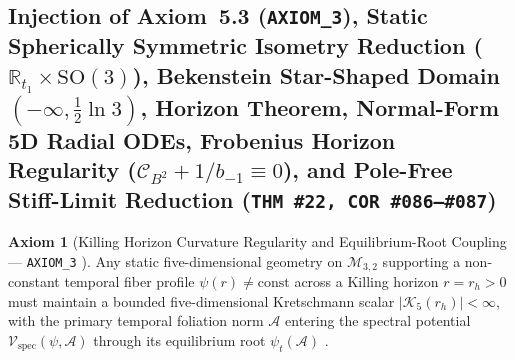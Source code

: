 \documentclass[11pt,a4paper]{article}
\newcommand{\catA}{\text{\textbf{\textcolor{purple!80!black}{[A]}}}}
\theoremstyle{definition}
\newtheorem{axiom}{Axiom}[section]
\theoremstyle{plain}
\theoremstyle{remark}
\begin{document}
\subsection{Injection of Axiom~5.3 (\texttt{AXIOM\_3}), Static Spherically Symmetric Isometry Reduction ($\mathbb{R}_{t_1} \times \mathrm{SO}(3)$), Bekenstein Star-Shaped Domain $(-\infty, \frac{1}{2}\ln 3)$, Horizon Theorem, Normal-Form 5D Radial ODEs, Frobenius Horizon Regularity ($\mathcal{C}_{B^2} + 1/b_{-1} \equiv 0$), and Pole-Free Stiff-Limit Reduction (\texttt{THM~\#22, COR~\#086--\#087})}

\begin{axiom}[{Killing Horizon Curvature Regularity and Equilibrium-Root Coupling --- \texttt{AXIOM\_3} \catA}]\label{ax:axiom_three}
Any static five-dimensional geometry on $\mathcal{M}_{3,2}$ supporting a non-constant temporal fiber profile $\psi(r) \neq \mathrm{const}$ across a Killing horizon $r = r_h > 0$ must maintain a bounded five-dimensional Kretschmann scalar $|\mathcal{K}_5(r_h)| < \infty$, with the primary temporal foliation norm $\mathcal{A}$ entering the spectral potential $\mathcal{V}_{\mathrm{spec}}(\psi, \mathcal{A})$ through its equilibrium root $\psi_t(\mathcal{A})$ \catA.
\end{axiom}
\end{document}
